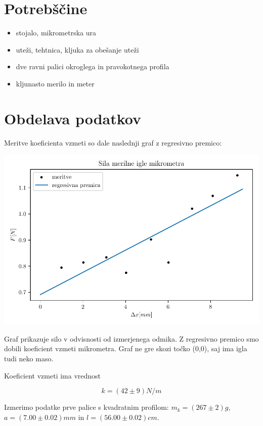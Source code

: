 \documentclass[12pt]{report}
\begin{document}
\begingroup
\let\clearpage\relax

\chapter*{Potrebščine}
\begin{itemize}
  \item stojalo, mikrometrska ura
  \item uteži, tehtnica, kljuka za obešanje uteži 
  \item dve ravni palici okroglega in pravokotnega profila 
  \item kljunasto merilo in meter 
\end{itemize}

\endgroup


\chapter*{Obdelava podatkov}

Meritve koeficienta vzmeti so dale naslednji graf z regresivno premico: 

\begin{slika}[H]
  \centering
  \includegraphics{igla}
  \caption{\small Graf prikazuje silo v odvisnosti od izmerjenega odmika. Z regresivno premico smo dobili koeficient vzmeti mikrometra. Graf ne gre skozi točko (0,0), saj ima igla tudi neko maso.}
\end{slika}

Koeficient vzmeti ima vrednost 

\[
k = (42 \pm 9)  N/m
\]

Izmerimo podatke prve palice s kvadratnim profilom: $m_k = (267 \pm 2)g$, $a = (7.00 \pm 0.02)mm$ in $l = (56.00 \pm 0.02)cm$. 
\end{document}
